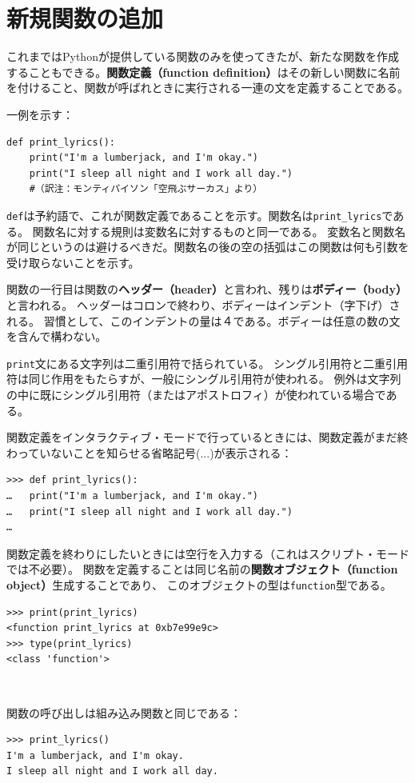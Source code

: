 \documentclass[a4j,12pt,makeidx]{jbook}
\begin{document}
\section{新規関数の追加}
これまではPythonが提供している関数のみを使ってきたが、新たな関数を作成することもできる。{\bf 関数定義（function definition）}はその新しい関数に名前を付けること、関数が呼ばれときに実行される一連の文を定義することである。\par
一例を示す：
\begin{verbatim}
def print_lyrics():
    print("I'm a lumberjack, and I'm okay.")
    print("I sleep all night and I work all day.")
    #（訳注：モンティパイソン「空飛ぶサーカス」より）
\end{verbatim}
{\tt def}は予約語で、これが関数定義であることを示す。関数名は{\tt print\_lyrics}である。
関数名に対する規則は変数名に対するものと同一である。
変数名と関数名が同じというのは避けるべきだ。関数名の後の空の括弧はこの関数は何も引数を受け取らないことを示す。\par
関数の一行目は関数の{\bf ヘッダー（header）}と言われ、残りは{\bf ボディー（body）}と言われる。
ヘッダーはコロンで終わり、ボディーはインデント（字下げ）される。
習慣として、このインデントの量は４である。ボディーは任意の数の文を含んで構わない。\par
{\tt print}文にある文字列は二重引用符で括られている。
シングル引用符と二重引用符は同じ作用をもたらすが、一般にシングル引用符が使われる。
例外は文字列の中に既にシングル引用符（またはアポストロフィ）が使われている場合である。 \par
関数定義をインタラクティブ・モードで行っているときには、関数定義がまだ終わっていないことを知らせる省略記号(...)が表示される：
\begin{verbatim}
>>> def print_lyrics():
…	print("I'm a lumberjack, and I'm okay.")
…	print("I sleep all night and I work all day.")
…
\end{verbatim} \par
関数定義を終わりにしたいときには空行を入力する（これはスクリプト・モードでは不必要）。
関数を定義することは同じ名前の{\bf 関数オブジェクト（function object）}生成することであり、
このオブジェクトの型は{\tt function}型である。
\begin{verbatim}
>>> print(print_lyrics)
<function print_lyrics at 0xb7e99e9c>
>>> type(print_lyrics)
<class 'function'>
\end{verbatim}　\par
関数の呼び出しは組み込み関数と同じである：
\begin{verbatim}
>>> print_lyrics()
I'm a lumberjack, and I'm okay.
I sleep all night and I work all day.
\end{verbatim} \par
\end{document}
